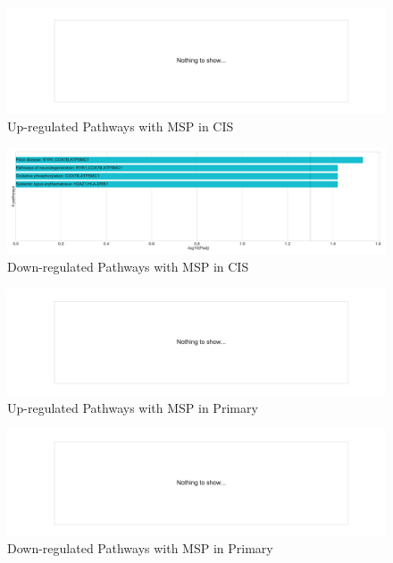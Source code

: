 \documentclass{beamer}
\begin{document}
\begin{frame}[allowframebreaks]
        \begin{figure}
            \includegraphics[width=0.7 \linewidth]{figures/DEG/Enrichment/STAR.FPKM.SQC.CIS.MSP-Median.Up.KEGG.pdf}
            \caption{Up-regulated Pathways with MSP in CIS}
        \end{figure}

        \begin{figure}
            \includegraphics[width=0.7 \linewidth]{figures/DEG/Enrichment/STAR.FPKM.SQC.CIS.MSP-Median.Down.KEGG.pdf}
            \caption{Down-regulated Pathways with MSP in CIS}
        \end{figure}

        \begin{figure}
            \includegraphics[width=0.7 \linewidth]{figures/DEG/Enrichment/STAR.FPKM.SQC.Primary.MSP-Median.Up.KEGG.pdf}
            \caption{Up-regulated Pathways with MSP in Primary}
        \end{figure}

        \begin{figure}
            \includegraphics[width=0.7 \linewidth]{figures/DEG/Enrichment/STAR.FPKM.SQC.Primary.MSP-Median.Down.KEGG.pdf}
            \caption{Down-regulated Pathways with MSP in Primary}
        \end{figure}
    \end{frame}
\end{document}
